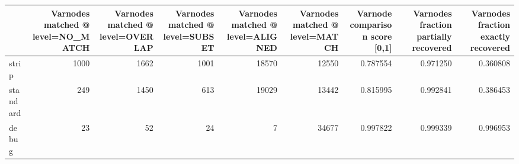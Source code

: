 \begin{tabular}{lrrrrrrrr}
\toprule
{} &  Varnodes matched @ level=NO\_MATCH &  Varnodes matched @ level=OVERLAP &  Varnodes matched @ level=SUBSET &  Varnodes matched @ level=ALIGNED &  Varnodes matched @ level=MATCH &  Varnode comparison score [0,1] &  Varnodes fraction partially recovered &  Varnodes fraction exactly recovered \\
\midrule
strip    &                               1000 &                              1662 &                             1001 &                             18570 &                           12550 &                        0.787554 &                               0.971250 &                             0.360808 \\
standard &                                249 &                              1450 &                              613 &                             19029 &                           13442 &                        0.815995 &                               0.992841 &                             0.386453 \\
debug    &                                 23 &                                52 &                               24 &                                 7 &                           34677 &                        0.997822 &                               0.999339 &                             0.996953 \\
\bottomrule
\end{tabular}
